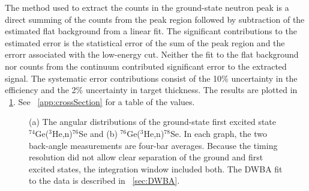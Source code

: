The method used to extract the counts in the ground-state neutron peak is a direct summing of the counts from the peak region followed by subtraction of the estimated flat background from a linear fit.  The significant contributions to the estimated error is the statistical error of the sum of the peak region and the errorr associated with the low-energy cut.  Neither the fit to the flat background nor counts from the continuum contributed significant error to the extracted signal.  The systematic error contributions consist of the 10\% uncertainty in the efficiency and the 2\% uncertainty in target thickness.  The results are plotted in {\fig}~\ref{fig:PS_angularDistribution}.  See {\app}~\ref{app:crossSection} for a table of the values.
\begin{figure}[!htbp]
\centering
{}
\caption[The angular distributions of the ground-state first excited state $^{74}$Ge($^3$He,n)$^{76}$Se and $^{76}$Ge($^3$He,n)$^{78}$Se.]{(a) The angular distributions of the ground-state first excited state $^{74}$Ge($^3$He,n)$^{76}$Se and (b) $^{76}$Ge($^3$He,n)$^{78}$Se.  In each graph, the two back-angle measurements are four-bar averages.  Because the timing resolution did not allow clear separation of the ground and first excited states, the integration window included both.  The DWBA fit to the data is described in {\sect}~\ref{sec:DWBA}.}
\label{fig:PS_angularDistribution}
\end{figure}

